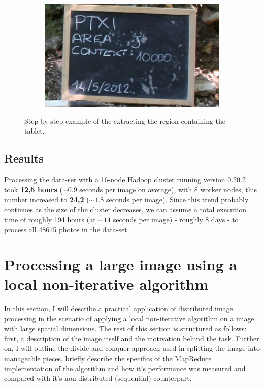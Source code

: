 \documentclass [12pt,a4paper]{report}
\begin{document}
\begin{figure}[h]
\begin{subfigure}{.5\textwidth}
	\caption{}
	\label{fig_bounding_box_small}
\end{subfigure}
\\
\begin{subfigure}{1.0\textwidth}
  \centering
  \includegraphics[scale=0.3]{box_extracted.eps} %
  \caption{}
	\label{fig_box_extracted_small}
\end{subfigure}
\caption[Step-by-step example of region extraction]{Step-by-step example of the extracting the region containing the tablet.}
\label{fig_pipeline_examples}
\end{figure}

\subsection{Results}

Processing the data-set with a 16-node Hadoop cluster running version 0.20.2 took \textbf{12,5 hours} ($\sim0.9$ seconds per image on average), with 8 worker nodes, this number increased to \textbf{24,2} ($\sim1.8$ seconds per image). Since this trend probably continues as the size of the cluster decreases, we can assume a total execution time of roughly 194 hours (at $\sim14$ seconds per image) - roughly 8 days - to process all 48675 photos in the data-set.

\section{Processing a large image using a local non-iterative algorithm}

In this section, I will describe a practical application of distributed image processing in the scenario of applying a local non-iterative algorithm on a image with large spatial dimensions. The rest of this section is structured as follows: first, a description of the image itself and the motivation behind the task. Further on, I will outline the divide-and-conquer approach used in splitting the image into manageable pieces, briefly describe the specifics of the MapReduce implementation of the algorithm and how it's performance was measured and compared with it's non-distributed (sequential) counterpart.
\end{document}
